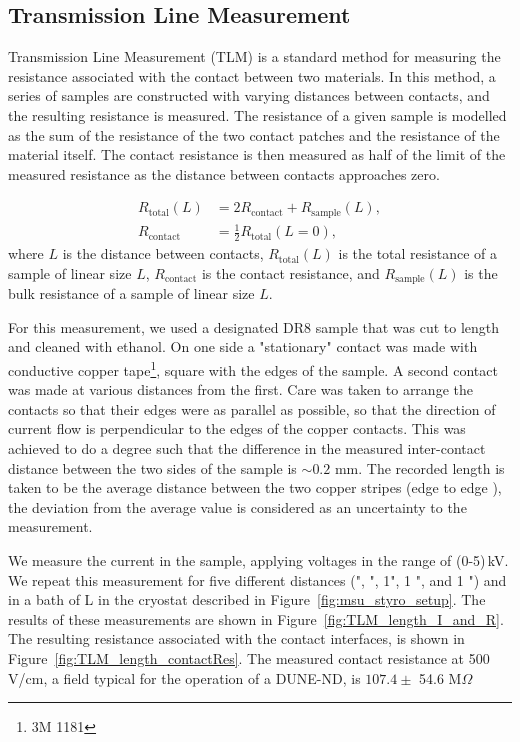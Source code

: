 \documentclass[a4paper,12pt]{article}
\newcommand{\DR}{DR8}
\begin{document}
\subsection{Transmission Line Measurement}
\label{sec:transLine}

Transmission Line Measurement (TLM) is a standard method for measuring the resistance associated with the contact between two materials.  In this method, a series of samples are constructed with varying distances between contacts, and the resulting resistance is measured.  The resistance of a given sample is modelled as the sum of the resistance of the two contact patches and the resistance of the material itself.  The contact resistance is then measured as half of the limit of the measured resistance as the distance between contacts approaches zero.

\begin{equation} \label{eq:TLM}
    \begin{split} 
        R_{\mathrm{total}}(L) &= 2 R_{\mathrm{contact}} + R_{\mathrm{sample}}(L), \\
        R_{\mathrm{contact}}  &= \tfrac{1}{2} R_{\mathrm{total}}(L = 0),
    \end{split}
\end{equation}
where $L$ is the distance between contacts, $R_{\mathrm{total}}(L)$ is the total resistance of a sample of linear size $L$, $R_\mathrm{contact}$ is the contact resistance, and $R_{\mathrm{sample}}(L)$ is the bulk resistance of a sample of linear size $L$.


For this measurement, we used a designated {\DR} sample that  was cut to length and cleaned with ethanol.  On one side a "stationary" contact was made with conductive copper tape\footnote{3M 1181}, square with the edges of the sample.  A second contact was made at various distances from the first.  Care was taken to arrange the contacts so that their edges were as parallel as possible, so that the direction of current flow is perpendicular to the edges of the copper contacts.  This was achieved to do a degree such that the difference in the measured inter-contact distance between the two sides of the sample is $\sim 0.2\,$\,mm.  The recorded length is taken to be the average distance between the two copper stripes (edge to edge ), the deviation from the average value is considered as an uncertainty to the measurement.

We measure the current in the sample, applying voltages in the range of (0-5)\,kV. We repeat this measurement for five different distances (", ", 1", 1 ", and 1 ") and in a bath of L in the cryostat described in Figure~\ref{fig:msu_styro_setup}. The results of these measurements are shown in Figure~\ref{fig:TLM_length_I_and_R}. The resulting resistance associated with the contact interfaces, is shown in Figure~\ref{fig:TLM_length_contactRes}.  The measured contact resistance at 500\,V/cm, a field typical for the operation of a DUNE-ND, is $107.4\pm$ 54.6 M$\Omega$
\end{document}
